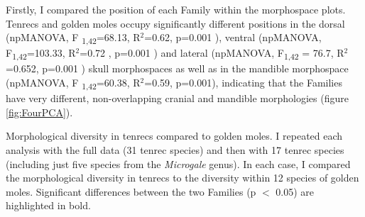 	Firstly, I compared the position of each Family within the morphospace plots. Tenrecs and golden moles occupy significantly different positions in the dorsal (npMANOVA, F \textsubscript{1,42}=68.13, R$^2$=0.62, p=0.001 ), ventral (npMANOVA, F\textsubscript{1,42}=103.33, R$^2$=0.72 , p=0.001 ) and lateral (npMANOVA, F\textsubscript{1,42} = 76.7, R$^2$ =0.652, p=0.001 ) skull morphospaces as well as in the mandible morphospace (npMANOVA, F \textsubscript{1,42}=60.38, R$^2$=0.59, p=0.001),  indicating that the Families have very different, non-overlapping cranial and mandible morphologies (figure \ref{fig:FourPCA}). 

	
	
	\begin{table}[!htbp]			
		\caption[Comparison of morphological diversity in tenrecs and golden moles.]
		{Morphological diversity in tenrecs compared to golden moles. I repeated each analysis with the full data (31 tenrec species) and then with 17 tenrec species (including just five species from the \textit{Microgale} genus). In each case, I compared the morphological diversity in tenrecs to the diversity within 12 species of golden moles. Significant differences between the two Families (p $<$ 0.05) are highlighted in bold.}
		 
		\label{tab:diversity}  
	\end{table}

	

